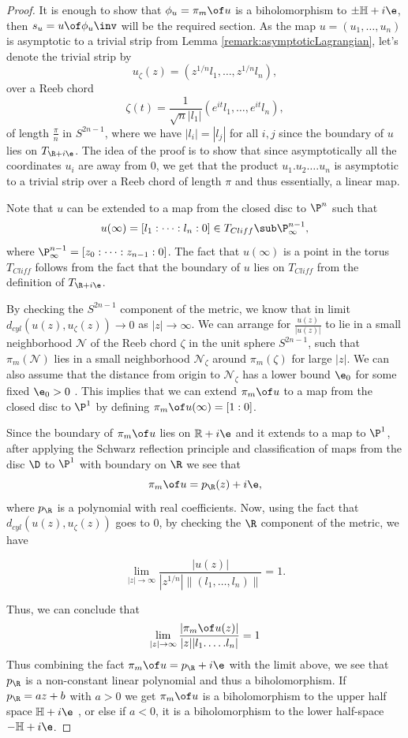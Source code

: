 \begin{proof}
It is enough to show that $\phi_u = \pi_m \of u$  is a biholomorphism to $\pm\mathbb{H}+i\e$, then $s_u= u \of \phi_u\inv$ will be the required section. As the map $u=(u_1,\dots,u_n)$ is asymptotic to a trivial strip from Lemma \ref{remark:asymptoticLagrangian}, let's denote the trivial strip by  $$u_\zeta (z)= (z^{1/n}l_1,\dots,z^{1/n}l_n),$$ over a Reeb chord $$\zeta(t)=\frac{1}{\sqrt{n}|l_1|}(e^{it} l_1,\dots,e^{it}l_n ),$$ of length $\frac{\pi}{n}$ in $S^{2n-1}$, where we have $|l_i|=|l_j| $ for all $i,j$ since the boundary of $u$ lies on $T_{\R + i\e}$. The idea of the proof is to show that since asymptotically all the coordinates $u_i$ are away from 0, we get that the product $u_1.u_2\dots.u_n$ is  asymptotic to a trivial strip over a Reeb chord of length $\pi$ and thus essentially, a linear map.

Note that $u$ can be extended to a map from the closed disc to $\P^n$  such that $$u(\infty) = [l_1: \dots:l_n:0] \in T_{Cliff} \sub \P^{n-1}_\infty, $$ where $\P^{n-1}_\infty =[z_0:\dots:z_{n-1}:0]$. The fact that $u(\infty)$  is a point in the torus $T_{Cliff}$ follows from the fact that the boundary of $u$ lies on $T_{Cliff}$ from the definition of $T_{\R +i\e}$.

By checking the $S^{2n-1}$ component of the metric, we know that in limit $d_{cyl} (u(z),u_\zeta(z)) \to 0$ as $|z| \to \infty$.  We can arrange for  $\frac{u(z)}{|u(z)|}$ to lie in a small neighborhood  $\mathcal{N}$ of the Reeb chord $\zeta$ in the unit sphere $S^{2n-1}$, such that $\pi_m (\mathcal{N}) $ lies in a small neighborhood $\mathcal{N}_\zeta$ around $\pi_m(\zeta )$ for large $|z|$. We can also assume that the distance from origin to $\mathcal{N}_\zeta$ has a lower bound $\e_0$ for some fixed $\e_0 > 0$ . This implies that we can extend $\pi_m \of u$ to  a map from the closed disc to $\P^1$ by defining $\pi_m \of u (\infty) =  [1:0]$.


Since the boundary of $\pi_m \of u$ lies on $\mathbb{R} + i\e $ and it extends to a map to $\P^1$, after applying the Schwarz reflection principle and classification of maps from  the disc $\D$ to $\P^1$ with boundary on $\R$ we see that $$\pi_m \of u = p_\R (z) + i\e,$$ where $p_\R$ is a polynomial with real coefficients. Now, using the fact that $d_{cyl}(u(z),u_\zeta(z))$ goes to 0, by checking the $\R$ component of the metric, we have



$$\lim_{|z|\to \infty} \frac{|u(z)|}{|z^{1/n}|\|(l_1,\dots,l_n)\|} = 1.$$

Thus, we can conclude  that 
$$\lim_{|z|\to \infty} \frac{|\pi_m \of u(z)|}{|z||l_1.\dots.l_n|} = 1$$
\noindent Thus combining the fact  $\pi_m \of u = p_\R + i\e$ with the limit above, we see that $p_\R$ is a non-constant linear polynomial and thus a biholomorphism. If $p_\R = az +b$ with $a>0$ we get $\pi_m \of u$ is a biholomorphism to the upper half space $\mathbb{H} + i\e$ , or else if $a<0$, it is a biholomorphism to the lower half-space $-\mathbb{H} + i\e$.



\end{proof}


